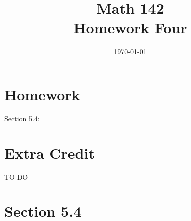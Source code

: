 \documentclass{exam}
\author{}
\date{\today}
\title{Math 142 \\ Homework Four}
\begin{document}
  \maketitle

  \section{Homework}
  Section 5.4: 

  \section{Extra Credit}
  TO DO

  \ifprintanswers

    \pagebreak

    \section{Section 5.4}
\end{document}

